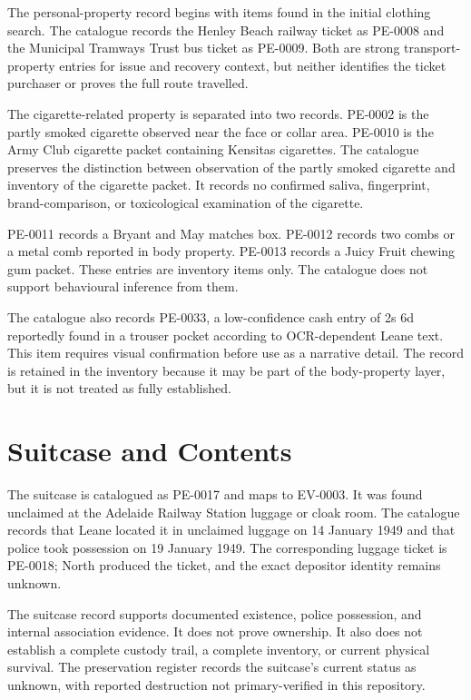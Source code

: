 The personal-property record begins with items found in the initial clothing search. The catalogue records the Henley Beach railway ticket as PE-0008 and the Municipal Tramways Trust bus ticket as PE-0009. Both are strong transport-property entries for issue and recovery context, but neither identifies the ticket purchaser or proves the full route travelled.

The cigarette-related property is separated into two records. PE-0002 is the partly smoked cigarette observed near the face or collar area. PE-0010 is the Army Club cigarette packet containing Kensitas cigarettes. The catalogue preserves the distinction between observation of the partly smoked cigarette and inventory of the cigarette packet. It records no confirmed saliva, fingerprint, brand-comparison, or toxicological examination of the cigarette.

PE-0011 records a Bryant and May matches box. PE-0012 records two combs or a metal comb reported in body property. PE-0013 records a Juicy Fruit chewing gum packet. These entries are inventory items only. The catalogue does not support behavioural inference from them.

The catalogue also records PE-0033, a low-confidence cash entry of 2s 6d reportedly found in a trouser pocket according to OCR-dependent Leane text. This item requires visual confirmation before use as a narrative detail. The record is retained in the inventory because it may be part of the body-property layer, but it is not treated as fully established.

\section{Suitcase and Contents}

The suitcase is catalogued as PE-0017 and maps to EV-0003. It was found unclaimed at the Adelaide Railway Station luggage or cloak room. The catalogue records that Leane located it in unclaimed luggage on 14 January 1949 and that police took possession on 19 January 1949. The corresponding luggage ticket is PE-0018; North produced the ticket, and the exact depositor identity remains unknown.

The suitcase record supports documented existence, police possession, and internal association evidence. It does not prove ownership. It also does not establish a complete custody trail, a complete inventory, or current physical survival. The preservation register records the suitcase's current status as unknown, with reported destruction not primary-verified in this repository.

